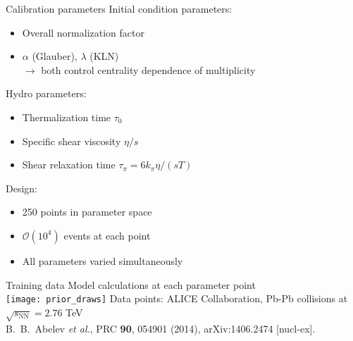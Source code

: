 \documentclass{beamer}
\begin{document}
\begin{frame}{Calibration parameters}
  Initial condition parameters:
  \begin{itemize}
    \item Overall normalization factor
    \item $\alpha$ (Glauber), $\lambda$ (KLN) \\
      $\rightarrow$ both control centrality dependence of multiplicity
  \end{itemize}
  Hydro parameters:
  \begin{itemize}
    \item Thermalization time $\tau_0$
    \item Specific shear viscosity $\eta/s$
    \item Shear relaxation time $\tau_\pi = 6k_\pi\eta/(sT)$ \enskip [vary $k_\pi$]
  \end{itemize}
  \bigskip
  Design:
  \begin{itemize}
    \item 250 points in parameter space
    \item $\mathcal O(10^4)$ events at each point
    \item All parameters varied simultaneously
  \end{itemize}
\end{frame}


\begin{frame}{Training data}
  \bigskip
  \centering
  Model calculations at each parameter point \\
  \bigskip
  \texttt{[image: prior\_draws]}
  \flushright
  \tiny
  Data points: ALICE Collaboration, Pb-Pb collisions at $\sqrt{s_\text{NN}} = 2.76$ TeV \\
  B.~B.~Abelev {\it et al.}, PRC {\bf 90}, 054901 (2014), arXiv:1406.2474 [nucl-ex].
\end{frame}
\end{document}
